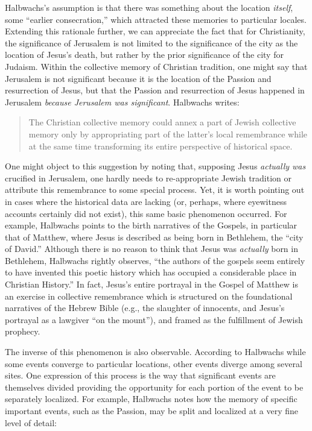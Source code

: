 Halbwachs's assumption is that there was something about the location
\emph{itself}, some ``earlier
consecration,''\autocite[220]{halbwachs1992} which attracted these
memories to particular locales. Extending this rationale further, we can
appreciate the fact that for Christianity, the significance of Jerusalem
is not limited to the significance of the city as the location of
Jesus's death, but rather by the prior significance of the city for
Judaism. Within the collective memory of Christian tradition, one might
say that Jerusalem is not significant because it is the location of the
Passion and resurrection of Jesus, but that the Passion and resurrection
of Jesus happened in Jerusalem \emph{because Jerusalem was significant}.
Halbwachs writes:

\begin{quote}
The Christian collective memory could annex a part of Jewish collective
memory only by appropriating part of the latter's local remembrance
while at the same time transforming its entire perspective of historical
space.\autocite[215]{halbwachs1992}
\end{quote}

One might object to this suggestion by noting that, supposing Jesus
\emph{actually was} crucified in Jerusalem, one hardly needs to
re-appropriate Jewish tradition or attribute this remembrance to some
special process. Yet, it is worth pointing out in cases where the
historical data are lacking (or, perhaps, where eyewitness accounts
certainly did not exist), this same basic phenomenon occurred. For
example, Halbwachs points to the birth narratives of the Gospels, in
particular that of Matthew, where Jesus is described as being born in
Bethlehem, the ``city of David.'' Although there is no reason to think
that Jesus was \emph{actually} born in Bethlehem, Halbwachs rightly
observes, ``the authors of the gospels seem entirely to have invented
this poetic history which has occupied a considerable place in Christian
History.''\autocite[214]{halbwachs1992} In fact, Jesus's entire
portrayal in the Gospel of Matthew is an exercise in collective
remembrance which is structured on the foundational narratives of the
Hebrew Bible (e.g., the slaughter of innocents, and Jesus's portrayal as
a lawgiver ``on the mount''), and framed as the fulfillment of Jewish
prophecy.

The inverse of this phenomenon is also observable. According to
Halbwachs while some events converge to particular locations, other
events diverge among several sites. One expression of this process is
the way that significant events are themselves divided providing the
opportunity for each portion of the event to be separately localized.
For example, Halbwachs notes how the memory of specific important
events, such as the Passion, may be split and localized at a very fine
level of detail:

